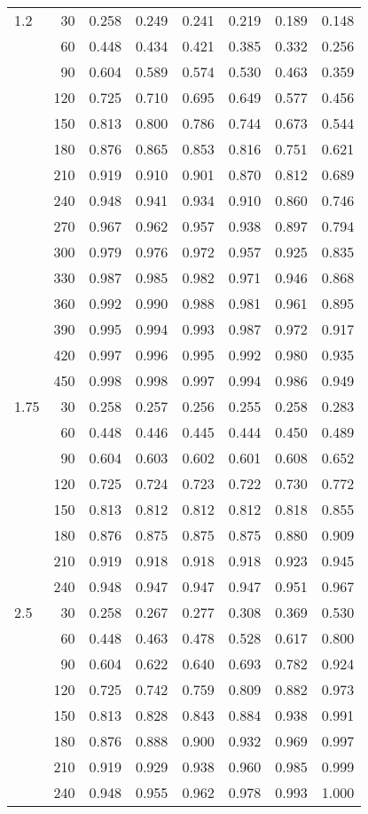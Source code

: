 \documentclass[bimj,fleqn]{w-art}\usepackage[]{graphicx}\usepackage[]{color}
\theoremstyle{plain}
\theoremstyle{definition}
\begin{document}
\begin{table}[ht]
\begin{tabular}{lrrrrrrr}
  1.2 & 30 & 0.258 & 0.249 & 0.241 & 0.219 & 0.189 & 0.148 \\ 
   & 60 & 0.448 & 0.434 & 0.421 & 0.385 & 0.332 & 0.256 \\ 
   & 90 & 0.604 & 0.589 & 0.574 & 0.530 & 0.463 & 0.359 \\ 
   & 120 & 0.725 & 0.710 & 0.695 & 0.649 & 0.577 & 0.456 \\ 
   & 150 & 0.813 & 0.800 & 0.786 & 0.744 & 0.673 & 0.544 \\ 
   & 180 & 0.876 & 0.865 & 0.853 & 0.816 & 0.751 & 0.621 \\ 
   & 210 & 0.919 & 0.910 & 0.901 & 0.870 & 0.812 & 0.689 \\ 
   & 240 & 0.948 & 0.941 & 0.934 & 0.910 & 0.860 & 0.746 \\ 
   & 270 & 0.967 & 0.962 & 0.957 & 0.938 & 0.897 & 0.794 \\ 
   & 300 & 0.979 & 0.976 & 0.972 & 0.957 & 0.925 & 0.835 \\ 
   & 330 & 0.987 & 0.985 & 0.982 & 0.971 & 0.946 & 0.868 \\ 
   & 360 & 0.992 & 0.990 & 0.988 & 0.981 & 0.961 & 0.895 \\ 
   & 390 & 0.995 & 0.994 & 0.993 & 0.987 & 0.972 & 0.917 \\ 
   & 420 & 0.997 & 0.996 & 0.995 & 0.992 & 0.980 & 0.935 \\ 
   & 450 & 0.998 & 0.998 & 0.997 & 0.994 & 0.986 & 0.949 \\ 
  1.75 & 30 & 0.258 & 0.257 & 0.256 & 0.255 & 0.258 & 0.283 \\ 
   & 60 & 0.448 & 0.446 & 0.445 & 0.444 & 0.450 & 0.489 \\ 
   & 90 & 0.604 & 0.603 & 0.602 & 0.601 & 0.608 & 0.652 \\ 
   & 120 & 0.725 & 0.724 & 0.723 & 0.722 & 0.730 & 0.772 \\ 
   & 150 & 0.813 & 0.812 & 0.812 & 0.812 & 0.818 & 0.855 \\ 
   & 180 & 0.876 & 0.875 & 0.875 & 0.875 & 0.880 & 0.909 \\ 
   & 210 & 0.919 & 0.918 & 0.918 & 0.918 & 0.923 & 0.945 \\ 
   & 240 & 0.948 & 0.947 & 0.947 & 0.947 & 0.951 & 0.967 \\ 
  2.5 & 30 & 0.258 & 0.267 & 0.277 & 0.308 & 0.369 & 0.530 \\ 
   & 60 & 0.448 & 0.463 & 0.478 & 0.528 & 0.617 & 0.800 \\ 
   & 90 & 0.604 & 0.622 & 0.640 & 0.693 & 0.782 & 0.924 \\ 
   & 120 & 0.725 & 0.742 & 0.759 & 0.809 & 0.882 & 0.973 \\ 
   & 150 & 0.813 & 0.828 & 0.843 & 0.884 & 0.938 & 0.991 \\ 
   & 180 & 0.876 & 0.888 & 0.900 & 0.932 & 0.969 & 0.997 \\ 
   & 210 & 0.919 & 0.929 & 0.938 & 0.960 & 0.985 & 0.999 \\ 
   & 240 & 0.948 & 0.955 & 0.962 & 0.978 & 0.993 & 1.000 \\ 
   \hline
\end{tabular}
\end{table}
\end{document}
